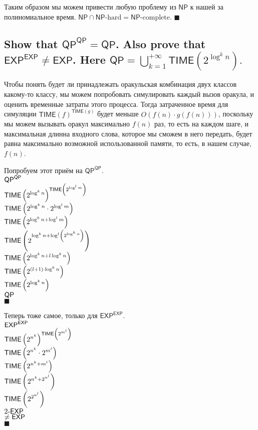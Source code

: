 \documentclass{article}
\newcommand{\QP}{\ensuremath{\mathsf{QP}}}
\newcommand{\NP}{\ensuremath{\mathsf{NP}}}
\newcommand{\TIME}{\ensuremath{\mathsf{TIME}}}
\newcommand{\EXP}{\ensuremath{\mathsf{EXP}}}
\begin{document}
  Таким образом мы можем привести любую проблему из \NP{} к нашей за полиномиальное время.
  $\NP \cap \NP\textrm{-hard} = \NP\textrm{-complete}$.
  $\blacksquare$

  \subsection{Show that $\QP^\QP = \QP$. Also prove that $\EXP^\EXP \neq \EXP$. Here $\QP = \bigcup^{+\infty}_{k=1} \TIME(2^{\log^k n}).$}
  Чтобы понять будет ли принадлежать оракульская комбинация двух классов какому-то классу, мы можем попробовать симулировать каждый вызов оракула, и оценить временные затраты этого процесса.
  Тогда затраченное время для симуляции $\TIME(f)^{\TIME(g)}$ будет меньше $O(f(n) \cdot g(f(n)))$, поскольку мы можем вызывать оракул максимально $f(n)$ раз, то есть на каждом шаге, и максимальная длинна входного слова, которое мы сможем в него передать, будет равна максимально возможной использованной памяти, то есть, в нашем случае, $f(n)$.

  \noindent
  Попробуем этот приём на $\QP^\QP$. \\
  $\ds \QP^\QP$ \\
  $\ds \TIME\l(2^{\log^k n}\r)^{\TIME\l(2^{\log^l m}\r)}$ \\
  $\ds \TIME\l(2^{\log^k n} \cdot 2^{\log^l m}\r)$ \\
  $\ds \TIME\l(2^{\log^k n + \log^l m}\r)$ \\
  $\ds \TIME\l(2^{\log^k n + \log^l \l(2^{\log^k n}\r)}\r)$ \\
  $\ds \TIME\l(2^{\log^k n + l \log^k n}\r)$ \\
  $\ds \TIME\l(2^{(l+1) \cdot \log^k n}\r)$ \\
  $\ds \TIME\l(2^{\log^k n}\r)$ \\
  $\ds \QP$ \\
  $\blacksquare$

  \noindent
  Теперь тоже самое, только для $\EXP^\EXP$. \\
  $\ds \EXP^\EXP$ \\
  $\ds \TIME\l(2^{n^k}\r)^{\TIME\l(2^{m^l}\r)}$ \\
  $\ds \TIME\l(2^{n^k} \cdot 2^{m^l}\r)$ \\
  $\ds \TIME\l(2^{n^k + m^l}\r)$ \\
  $\ds \TIME\l(2^{n^k + 2^{n^l}}\r)$ \\
  $\ds \TIME\l(2^{2^{n^l}}\r)$ \\
  $\ds 2\textrm{-}\EXP$ \\
  $\ds \neq \EXP$ \\
  $\blacksquare$
\end{document}
